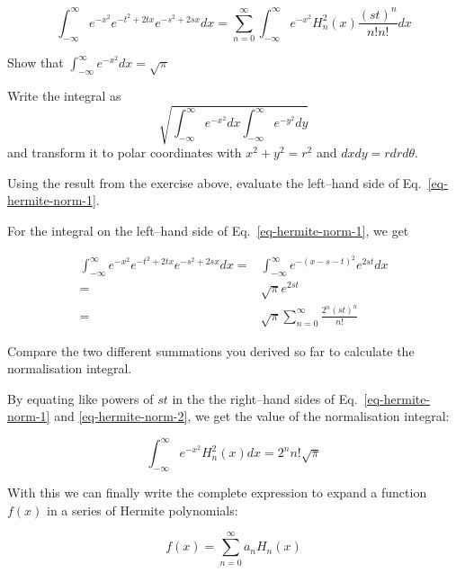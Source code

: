 \begin{equation}
\int_{-\infty}^{\infty} e^{-x^2} e^{-t^2 + 2tx} e^{-s^2 + 2sx} dx= \sum_{n = 0}^{\infty} \int_{-\infty}^{\infty} e^{-x^2} H_n^2(x)\frac{(st)^n}{n!n!} dx \label{eq-hermite-norm-1}
\end{equation}

\begin{exer}
Show that $\int_{-\infty}^{\infty}e^{-x^2}dx = \sqrt{\pi}$
\begin{hnt}
Write the integral as
$$\sqrt{\int_{-\infty}^{\infty} e^{-x^2}dx\int_{-\infty}^{\infty} e^{-y^2}dy}$$
and transform it to polar coordinates with $x^2+y^2=r^2$ and $dxdy = r dr d\theta$.
\end{hnt}
\end{exer}

\begin{cue}
Using the result from the exercise above, evaluate the left--hand side of Eq.~\ref{eq-hermite-norm-1}.
\end{cue}

For the integral on the left--hand side of Eq.~\ref{eq-hermite-norm-1}, we get 

\begin{align}
\int_{-\infty}^{\infty} e^{-x^2} e^{-t^2 + 2tx} e^{-s^2 + 2sx} dx 
  = & \int_{-\infty}^{\infty} e^{-(x-s-t)^2} e^{2st}dx \nonumber \\
  = & \sqrt{\pi} e^{2st} \nonumber \\
  = & \sqrt{\pi} \sum_{n = 0}^{\infty} \frac{2^n{(st)}^n}{n!}  \label{eq-hermite-norm-2}
\end{align} 

\pagebreak

\begin{cue}
Compare the two different summations you derived so far to calculate the normalisation integral.
\end{cue}

By equating like powers of $st$ in the the right--hand sides of Eq.~\ref{eq-hermite-norm-1} and \ref{eq-hermite-norm-2}, we get the value of the normalisation integral:

\begin{equation}
\int_{-\infty}^{\infty} e^{-x^2} H_n^2(x) dx = 2^n n! \sqrt{\pi}
\end{equation} 

With this we can finally write the complete expression to expand a function $f(x)$ in a series of Hermite polynomials:

\begin{equation}
f(x) = \sum_{n=0}^{\infty}a_n H_n(x)
\end{equation} 

